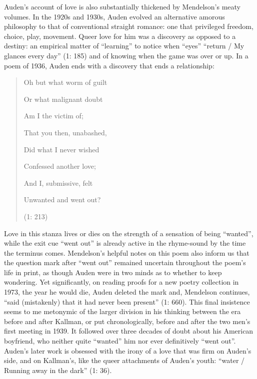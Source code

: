 \documentclass{article}
\begin{document}
Auden's account of love is also substantially thickened by Mendelson's meaty volumes. In the 1920s and 1930s, Auden evolved an
alternative amorous philosophy to that of conventional straight romance:
one that privileged freedom, choice, play, movement. Queer love for him
was a discovery as opposed to a destiny: an empirical matter of
``learning'' to notice when ``eyes'' ``return / My glances every day''
(1: 185) and of knowing when the game was over or up. In a poem of 1936,
Auden ends with a discovery that ends a relationship:

\begin{quote}
Oh but what worm of guilt

Or what malignant doubt

Am I the victim of;

That you then, unabashed,

Did what I never wished

Confessed another love;

And I, submissive, felt

Unwanted and went out?

\begin{flushright}
    (1: 213)
\end{flushright}
\end{quote}

\noindent Love in this stanza lives or dies on the strength of a sensation of
being ``wanted'', while the exit cue ``went out'' is already active in
the rhyme-sound by the time the terminus comes. Mendelson's helpful
notes on this poem also inform us that the question mark after ``went
out'' remained uncertain throughout the poem's life in print, as though
Auden were in two minds as to whether to keep wondering. Yet
significantly, on reading proofs for a new poetry collection in 1973,
the year he would die, Auden deleted the mark and, Mendelson continues,
``said (mistakenly) that it had never been present'' (1: 660). This
final insistence seems to me metonymic of the larger division in his
thinking between the era before and after Kallman, or put
chronologically, before and after the two men's first meeting in 1939.
It followed over three decades of doubt about his American boyfriend,
who neither quite ``wanted'' him nor ever definitively ``went out''.
Auden's later work is obsessed with the irony of a love that was firm on
Auden's side, and on Kallman's, like the queer attachments of Auden's
youth: ``water / Running away in the dark'' (1: 36).
\end{document}
